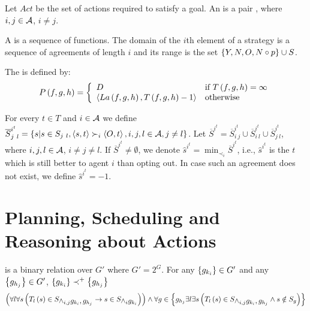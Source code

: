 \begin{defi}[Agreement]
Let $Act$ be the set of actions required to satisfy a goal. An  is a pair , where $i,j\in\mathcal{A}$, $i\neq j$.
\cite{conf/ijcai/KrausW91}
\end{defi}

\begin{defi}[Strategy]
A  is a sequence of functions. The domain of the $i$th element of a strategy is a sequence of agreements of length $i$ and its range is the set $\left\{ Y,N,O,N\circ p\right\}\cup S$.
\cite{conf/ijcai/KrausW91}
\end{defi}

\begin{defi}
The  is defined by:
\begin{equation}
P\left(f,g,h\right)=\left\{\begin{array}{ll}
D&\mbox{if }T\left(f,g,h\right)=\infty\\
\left\langle La\left(f,g,h\right),T\left(f,g,h\right)-1\right\rangle&\mbox{otherwise}
\end{array}\right.
\end{equation}
\cite{conf/ijcai/KrausW91}
\end{defi}

\begin{defi}
For every $t\in T$ and $i\in\mathcal{A}$ we define $\overline{S}^{i^t}_{j\ l}=\accol{s|s\in S_{j\ l},\tuple{s,t}\succ_i\tuple{O,t},i,j,l\in\calA,j\neq l}$. Let $\overline{S}^{i^t}=\overline{S}^{i^t}_{i\ j}\cup\overline{S}^{i^t}_{i\ l}\cup\overline{S}^{i^t}_{j\ l}$, where $i,j,l\in\mathcal{A}$, $i\neq j\neq l$. If $\overline{S}^{i^t}\neq\emptyset$, we denote $\hat{s}^{i^t}=\displaystyle\min_{\prec_i}\overline{S}^{i^t}$, i.e., $\hat{s}^{i^t}$ is the  $t$ which is still better to agent $i$ than opting out. In case such an agreement does not exist, we define $\hat{s}^{i^t}=-1$.
\cite{conf/ijcai/KrausW91}
\end{defi}

\section{Planning, Scheduling and Reasoning about Actions}

\begin{defi}
 is a binary relation over $G'$ where $G'=2^{G}$. For any $\left\{ g_{k_i}\right\}\in G'$ and any $\left\{ g_{h_j}\right\}\in G'$, $\left\{ g_{k_i}\right\}\prec^+\left\{ g_{h_j}\right\}$ \iffTx{}
\begin{equation}
\left( \forall l\forall s\left( T_l\left(s\right)\in S_{\displaystyle\wedge_{i,j}g_{k_i},g_{h_j}}\rightarrow s\in S_{\displaystyle\wedge_ig_{k_i}}\right)\right)\wedge\forall g\in\left\{ g_{h_j}\exists l\exists s\left( T_l\left(s\right)\in S_{\displaystyle\wedge_{i,j}g_{k_i},g_{h_j}}\wedge s\notin S_g\right)\right\}
\end{equation}
\cite{conf/ijcai/ChengI89}
\end{defi}

